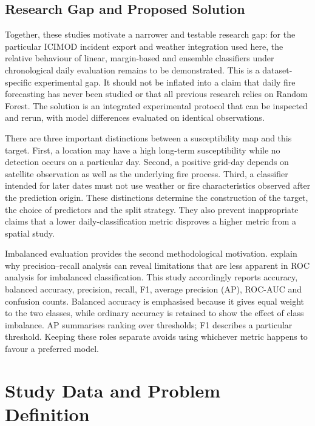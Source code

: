 \documentclass[conference,a4paper]{IEEEtran}
\begin{document}
\subsection{Research Gap and Proposed Solution}
Together, these studies motivate a narrower and testable research gap: for the particular ICIMOD incident export and weather integration used here, the relative behaviour of linear, margin-based and ensemble classifiers under chronological daily evaluation remains to be demonstrated. This is a dataset-specific experimental gap. It should not be inflated into a claim that daily fire forecasting has never been studied or that all previous research relies on Random Forest. The solution is an integrated experimental protocol that can be inspected and rerun, with model differences evaluated on identical observations.

There are three important distinctions between a susceptibility map and this target. First, a location may have a high long-term susceptibility while no detection occurs on a particular day. Second, a positive grid-day depends on satellite observation as well as the underlying fire process. Third, a classifier intended for later dates must not use weather or fire characteristics observed after the prediction origin. These distinctions determine the construction of the target, the choice of predictors and the split strategy. They also prevent inappropriate claims that a lower daily-classification metric disproves a higher metric from a spatial study.

Imbalanced evaluation provides the second methodological motivation. \citet{saito} explain why precision--recall analysis can reveal limitations that are less apparent in ROC analysis for imbalanced classification. This study accordingly reports accuracy, balanced accuracy, precision, recall, F1, average precision (AP), ROC-AUC and confusion counts. Balanced accuracy is emphasised because it gives equal weight to the two classes, while ordinary accuracy is retained to show the effect of class imbalance. AP summarises ranking over thresholds; F1 describes a particular threshold. Keeping these roles separate avoids using whichever metric happens to favour a preferred model.

\section{Study Data and Problem Definition}
\end{document}
